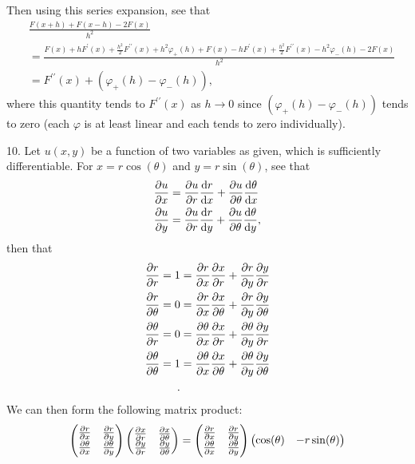 \documentclass[11pt]{article}
\newcommand{\br}[1]{\left(#1\right)}
\begin{document}
Then using this series expansion, see that \begin{align*}&\frac{F(x+h) + F(x-h)-2F(x)}{h^2} \\ &= \frac{F(x) + hF^{\prime}(x) + \frac{h^2}{2}F^{\prime \prime}(x) + h^2\varphi_{+}(h) + F(x) - hF^{\prime}(x) + \frac{h^2}{2}F^{\prime \prime}(x) - h^2\varphi_{-}(h) - 2F(x)}{h^2} \\ &= F^{\prime\prime}(x) + \br{\varphi_{+}(h) - \varphi_{-}(h)},\end{align*} where this quantity tends to $F^{\prime\prime}(x)$ as $h\to 0$ since $\br{\varphi_{+}(h) - \varphi_{-}(h)}$ tends to zero (each $\varphi$ is at least linear and each tends to zero individually).

10. Let $u(x,y)$ be a function of two variables as given, which is sufficiently differentiable. For $x = r\cos(\theta)$ and $y = r\sin(\theta)$, see that \begin{align*}\pdv{u}{x} &= \pdv{u}{r}\dv{r}{x} + \pdv{u}{\theta}\dv{\theta}{x} \\ \pdv{u}{y} &= \pdv{u}{r}\dv{r}{y} + \pdv{u}{\theta}\dv{\theta}{y},\end{align*} then that \begin{align*}\pdv{r}{r} = 1 &= \pdv{r}{x}\pdv{x}{r} + \pdv{r}{y}\pdv{y}{r}\\ \pdv{r}{\theta} = 0 &= \pdv{r}{x}\pdv{x}{\theta} + \pdv{r}{y}\pdv{y}{\theta}\\ \pdv{\theta}{r} = 0 &= \pdv{\theta}{x}\pdv{x}{r} + \pdv{\theta}{y}\pdv{y}{r}\\ \pdv{\theta}{\theta} = 1 &= \pdv{\theta}{x}\pdv{x}{\theta} + \pdv{\theta}{y}\pdv{y}{\theta}\\.\end{align*} We can then form the following matrix product: \[\begin{pmatrix}
  \pdv{r}{x} & \pdv{r}{y} \\ 
  \pdv{\theta}{x} & \pdv{\theta}{y}
\end{pmatrix}\begin{pmatrix}
  \pdv{x}{r} & \pdv{x}{\theta} \\
  \pdv{y}{r} & \pdv{y}{\theta}
\end{pmatrix} = \begin{pmatrix}
  \pdv{r}{x} & \pdv{r}{y} \\ 
  \pdv{\theta}{x} & \pdv{\theta}{y}
\end{pmatrix}\begin{pmatrix}
  \cos(\theta) & -r\sin(\theta) \\

\end{pmatrix}\]
\end{document}
